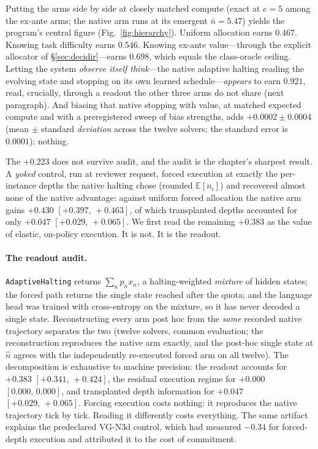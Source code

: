 \documentclass{article}
\newcommand{\Hun}{$0.467$}
\newcommand{\Hdif}{$0.546$}
\newcommand{\Hval}{$0.698$}
\newcommand{\Hpost}{$0.921$}
\newcommand{\VGBcero}{$+0.0002\pm0.0004$}
\newcommand{\Ytotal}{$+0.430$} \newcommand{\YtotalIC}{$[+0.397,\,+0.463]$}
\newcommand{\Yregimen}{$+0.383$} \newcommand{\YregimenIC}{$[+0.341,\,+0.424]$}
\newcommand{\Yinfo}{$+0.047$} \newcommand{\YinfoIC}{$[+0.029,\,+0.065]$}
\newcommand{\Rlectura}{$+0.383$} \newcommand{\RlecturaIC}{$[+0.341,\,+0.424]$}
\newcommand{\Rregimen}{$+0.000$} \newcommand{\RregimenIC}{$[0.000,\,0.000]$}
\begin{document}
Putting the arms side by side at closely matched compute (exact at $e{=}5$
among the ex-ante arms; the native arm runs at its emergent $\bar n{=}5.47$)
yields the program's central
figure (Fig.~\ref{fig:hierarchy}). Uniform allocation earns \Hun. Knowing
task difficulty earns \Hdif. Knowing ex-ante value---through the explicit
allocator of \S\ref{sec:decidir}---earns \Hval, which equals the class-oracle
ceiling. Letting the system \emph{observe itself think}---the native
adaptive halting reading the evolving state and stopping on its own learned
schedule---\emph{appears} to earn \Hpost, read, crucially, through a readout
the other three arms do not share (next paragraph). And biasing that native
stopping with value, at matched
expected compute and with a preregistered sweep of bias strengths, adds
\VGBcero{} (mean $\pm$ standard \emph{deviation} across the twelve solvers;
the standard error is $0.0001$):
nothing.

The $+0.223$ does not survive audit, and the audit is the chapter's
sharpest result. A \emph{yoked} control, run at reviewer request, forced
execution at exactly the per-instance depths the native halting chose
(rounded $\mathbb{E}[n_i]$) and recovered almost none of the native
advantage: against uniform forced allocation the native arm gains \Ytotal{}
\YtotalIC{}, of which transplanted depths accounted for only \Yinfo{}
\YinfoIC. We first read the remaining \Yregimen{} as the value of elastic,
on-policy execution. It is not. It is the readout.

\paragraph{The readout audit.} \texttt{AdaptiveHalting} returns
$\sum_n p_n x_n$, a halting-weighted \emph{mixture} of hidden states;
the forced path returns the single state reached after the quota; and the
language head was trained with cross-entropy on the mixture, so it has
never decoded a single state. Reconstructing every arm post hoc from the
\emph{same} recorded native trajectory separates the two (twelve solvers,
common evaluation; the reconstruction reproduces the native arm exactly,
and the post-hoc single state at $\hat n$ agrees with the independently
re-executed forced arm on all twelve). The decomposition is exhaustive to
machine precision: the readout accounts for \Rlectura{} \RlecturaIC, the
residual execution regime for \Rregimen{} \RregimenIC, and transplanted
depth information for \Yinfo{} \YinfoIC. Forcing execution costs nothing:
it reproduces the native trajectory tick by tick. Reading it differently
costs everything. The same artifact explains the predeclared VG-N3d
control, which had measured $-0.34$ for forced-depth execution and
attributed it to the cost of commitment.
\end{document}
